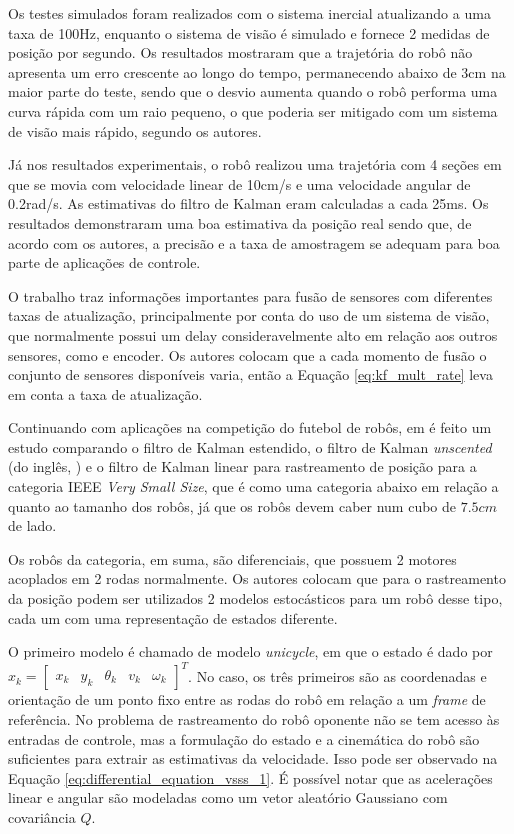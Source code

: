 \documentclass[acronym, symbols, table]{fei}
\begin{document}
Os testes simulados foram realizados com o sistema inercial atualizando a uma taxa de 100Hz, enquanto o sistema de visão é simulado e fornece 2 medidas de posição por segundo. Os resultados mostraram que a trajetória do robô não apresenta um erro crescente ao longo do tempo, permanecendo abaixo de 3cm na maior parte do teste, sendo que o desvio aumenta quando o robô performa uma curva rápida com um raio pequeno, o que poderia ser mitigado com um sistema de visão mais rápido, segundo os autores.

Já nos resultados experimentais, o robô realizou uma trajetória com 4 seções em que se movia com velocidade linear de 10cm/s e uma velocidade angular de 0.2rad/s. As estimativas do filtro de Kalman eram calculadas a cada 25ms. Os resultados demonstraram uma boa estimativa da posição real sendo que, de acordo com os autores, a precisão e a taxa de amostragem se adequam para boa parte de aplicações de controle.

O trabalho traz informações importantes para fusão de sensores com diferentes taxas de atualização, principalmente por conta do uso de um sistema de visão, que normalmente possui um delay consideravelmente alto em relação aos outros sensores, como  e encoder. Os autores colocam que a cada momento de fusão o conjunto de sensores disponíveis varia, então a Equação \eqref{eq:kf_mult_rate} leva em conta a taxa de atualização.

Continuando com aplicações na competição do futebol de robôs, em \textcite{aguiar2017kalman} é feito um estudo comparando o filtro de Kalman estendido, o filtro de Kalman \textit{unscented} (do inglês, ) e o filtro de Kalman linear para rastreamento de posição para a categoria IEEE \textit{Very Small Size}, que é como uma categoria abaixo em relação a  quanto ao tamanho dos robôs, já que os robôs devem caber num cubo de $7.5cm$ de lado.

Os robôs da categoria, em suma, são diferenciais, que possuem 2 motores acoplados em 2 rodas normalmente. Os autores colocam que para o rastreamento da posição podem ser utilizados 2 modelos estocásticos para um robô desse tipo, cada um com uma representação de estados diferente. 

O primeiro modelo é chamado de modelo \textit{unicycle}, em que o estado é dado por $x_k = \begin{bmatrix}
	x_k & y_k & \theta_k & v_k & \omega_k \end{bmatrix}^T$. No caso, os três primeiros são as coordenadas e orientação de um ponto fixo entre as rodas do robô em relação a um \textit{frame} de referência. No problema de rastreamento do robô oponente não se tem acesso às entradas de controle, mas a formulação do estado e a cinemática do robô são suficientes para extrair as estimativas da velocidade. Isso pode ser observado na Equação \eqref{eq:differential_equation_vsss_1}. É possível notar que as acelerações linear e angular são modeladas como um vetor aleatório Gaussiano com covariância $Q$.
\end{document}
